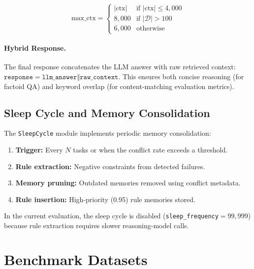 \documentclass[11pt,a4paper]{article}
\begin{document}
\begin{equation}
    \text{max\_ctx} = \begin{cases}
        |\text{ctx}|       & \text{if } |\text{ctx}| \leq 4{,}000 \\
        8{,}000            & \text{if } |\mathcal{D}| > 100 \\
        6{,}000            & \text{otherwise}
    \end{cases}
\end{equation}

\paragraph{Hybrid Response.}
The final response concatenates the LLM answer with raw retrieved context:
$\texttt{response} = \texttt{llm\_answer} \mathbin\Vert \texttt{raw\_context}$.
This ensures both concise reasoning (for factoid QA) and keyword overlap
(for content-matching evaluation metrics).


\subsection{Sleep Cycle and Memory Consolidation}
\label{sec:sleep}

The \texttt{SleepCycle} module implements periodic memory consolidation:
\begin{enumerate}[nosep]
    \item \textbf{Trigger:} Every $N$ tasks or when the conflict rate exceeds a threshold.
    \item \textbf{Rule extraction:} Negative constraints from detected failures.
    \item \textbf{Memory pruning:} Outdated memories removed using conflict metadata.
    \item \textbf{Rule insertion:} High-priority (0.95) rule memories stored.
\end{enumerate}

In the current evaluation, the sleep cycle is disabled
(\texttt{sleep\_frequency}$= 99{,}999$) because rule extraction requires
slower reasoning-model calls.


\section{Benchmark Datasets}
\label{sec:datasets}
\end{document}
